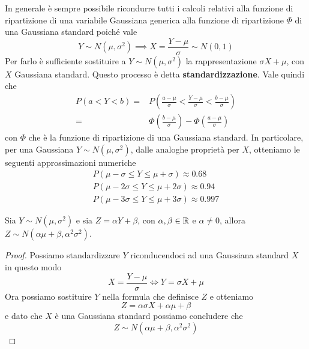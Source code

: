 \label{standardizzazione}
In generale è sempre possibile ricondurre tutti i calcoli relativi alla funzione di ripartizione
di una variabile Gaussiana generica alla funzione di ripartizione $\Phi$ di una Gaussiana standard
poiché vale
\[ Y \sim N(\mu, \sigma^2) \implies X = \frac{Y - \mu}{\sigma} \sim N(0,1) \]
Per farlo è sufficiente sostituire a $Y \sim N(\mu, \sigma^2)$ la rappresentazione $\sigma X + \mu$,
con $X$ Gaussiana standard. Questo processo è detta \textbf{standardizzazione}. Vale quindi che
\begin{align*}
	P(a < Y < b) = & P \left( \frac{a - \mu}{\sigma} < \frac{Y - \mu}{\sigma}
	< \frac{b - \mu}{\sigma} \right)                                          \\
	=              & \Phi \left( \frac{b - \mu}{\sigma} \right) -
	\Phi \left( \frac{a - \mu}{\sigma} \right)
\end{align*}
con $\Phi$ che è la funzione di ripartizione di una Gaussiana standard. In particolare, per una
Gaussiana $Y \sim N(\mu, \sigma^2)$, dalle analoghe proprietà per $X$, otteniamo le seguenti
approssimazioni numeriche
\begin{gather*}
	P(\mu - \sigma \leq Y \leq \mu + \sigma) \approx 0.68 \\
	P(\mu - 2 \sigma \leq Y \leq \mu + 2 \sigma) \approx 0.94 \\
	P(\mu - 3 \sigma \leq Y \leq \mu + 3 \sigma) \approx 0.997
\end{gather*}

\begin{theorem}[Riproducibilità]\label{th: riprod_gauss}
	Sia $Y \sim N(\mu, \sigma^2)$ e sia $Z = \alpha Y + \beta$, con $\alpha, \beta \in \mathbb{R}$ e
	$\alpha \neq 0$, allora $Z \sim N(\alpha \mu + \beta, \alpha^2 \sigma^2)$.
	\begin{proof}
		Possiamo standardizzare $Y$ riconducendoci ad una Gaussiana standard $X$ in questo modo
		\[ X = \frac{Y - \mu}{\sigma} \iff Y = \sigma X + \mu \]
		Ora possiamo sostituire $Y$ nella formula che definisce $Z$ e otteniamo
		\[ Z = \alpha \sigma X + \alpha \mu + \beta \]
		e dato che $X$ è una Gaussiana standard possiamo concludere che
		\[ Z \sim N(\alpha \mu + \beta, \alpha^2 \sigma^2) \]
	\end{proof}
\end{theorem}
